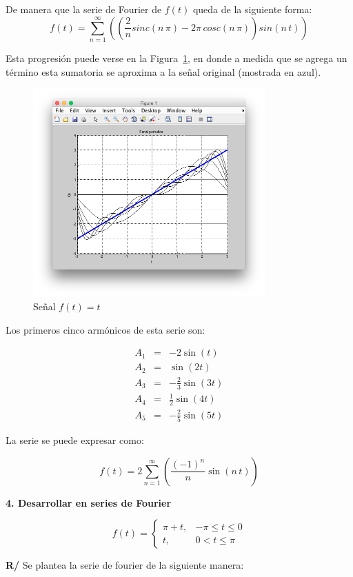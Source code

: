 \documentclass[twocolumn]{article}
\begin{document}
De manera que la serie de Fourier de $f(t)$ queda de la siguiente forma:
$$f(t) = \sum_{n=1}^\infty\left(\left(\frac{2}{n}sinc(n\,\pi) -2\pi\,cosc(n\,\pi)\right)sin(n\,t)\right)$$

Esta progresión puede verse en la Figura~\ref{fig_3}, en donde a medida que se agrega un término esta sumatoria se aproxima a la señal original (mostrada en azul).

\begin{figure}[!t]
\centering
\includegraphics[width=3.5in]{imgs/lin.png}
\caption{Señal $f(t) = t$}
\label{fig_3}
\end{figure}

Los primeros cinco armónicos de esta serie son:

\begin{eqnarray*}
A_1 &=& - 2\sin{(t)} \\
A_2 &=& \sin{(2t)} \\
A_3 &=& - \frac{2}{3}\sin{(3t)} \\
A_4 &=& \frac{1}{2}\sin{(4t)} \\
A_5 &=& - \frac{2}{5}\sin{(5t)}
\end{eqnarray*}

La serie se puede expresar como:

$$f(t) = 2 \sum_{n=1}^\infty\left(\frac{(-1)^n}{n}\sin{(n\,t)}\right)$$

\textbf{4. Desarrollar en series de Fourier}

$$f(t) = \begin{cases}
\pi +t, &-\pi \leq t \leq 0\\
t, &0 < t \leq \pi
\end{cases}$$

\textbf{R/} Se plantea la serie de fourier de la siguiente manera:
\end{document}
